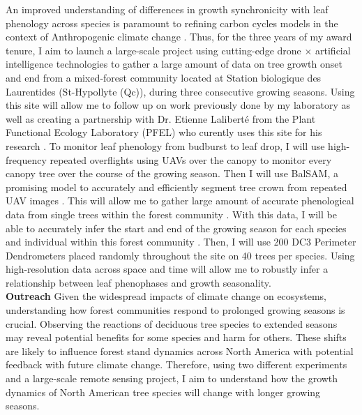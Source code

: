 \documentclass[12pt]{article}
\begin{document}
An improved understanding of differences in growth synchronicity with leaf phenology across species is paramount to refining carbon cycles models in the context of Anthropogenic climate change \cite{klein_coordination_2016,kramer_importance_2000,richardson_climate_2013,swidrak_comparing_2013}. Thus, for the three years of my award tenure, I aim to launch a large-scale project using cutting-edge drone $\times$  artificial intelligence technologies \cite{ball_accurate_2023,teng_bringing_2025,ulku_deep_2022} to gather a large amount of data on tree growth onset and end from a mixed-forest community located at Station biologique des Laurentides (St-Hypollyte (Qc)), during three consecutive growing seasons. Using this site will allow me to follow up on work previously done by my laboratory \cite{flynn_temperature_2018} as well as creating a partnership with Dr. Etienne Laliberté from the Plant Functional Ecology Laboratory (PFEL) who curently uses this site for his research \cite{cloutier_influence_2024}. To monitor leaf phenology from budburst to leaf drop, I will use high-frequency repeated overflights using UAVs over the canopy to monitor every canopy tree over the course of the growing season. Then I will use BalSAM, a promising model to accurately and efficiently segment tree crown from repeated UAV images \cite{teng_bringing_2025}. This will allow me to gather large amount of accurate phenological data from single trees within the forest community \cite{teng_bringing_2025}. With this data, I will be able to accurately infer the start and end of the growing season for each species and individual within this forest community \cite{berra_assessing_2019,fawcett_monitoring_2021}. Then, I will use 200 DC3 Perimeter Dendrometers placed randomly throughout the site on 40 trees per species. Using high-resolution data across space and time will allow me to robustly infer a relationship between leaf phenophases and growth seasonality.\\
\textbf{Outreach}
Given the widespread impacts of climate change on ecosystems, understanding how forest communities respond to prolonged growing seasons is crucial. Observing the reactions of deciduous tree species to extended seasons may reveal potential benefits for some species and harm for others. These shifts are likely to influence forest stand dynamics across North America with potential feedback with future climate change. Therefore, using two different experiments and a large-scale remote sensing project, I aim to understand how the growth dynamics of North American tree species will change with longer growing seasons.  

\newpage

\end{document}
